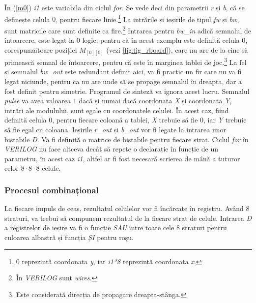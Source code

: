 \documentclass[12pt,twoside,a4paper,fleqn]{book}
\theoremstyle{definition}
\begin{document}
În (\ref{m0}) \emph{i1} este variabila din ciclul \emph{for}. Se vede deci din parametrii \emph{r} și \emph{b}, că se definește celula $0$, pentru fiecare linie.\footnote{0 reprezintă coordonata \emph{y}, iar \emph{i1*8} reprezintă coordonata \emph{x}.} La intrările și ieșirile de tipul \emph{fw} și \emph{bw}, sunt matricile care sunt definite ca fire.\footnote{În \emph{VERILOG} sunt \emph{wires}.} Intrarea pentru \emph{bw\_in} adică semnalul de întoarcere, este legat la $0$ logic, pentru că în acest exemplu este definită celula $0$, corespunzătoare poziției $M_{[0][0]}$ (vezi \ref{fig:fig_rboard}), care nu are de la cine să primească semnal de întoarcere, pentru că este în marginea tablei de joc.\footnote{Este considerată direcția de propagare dreapta-stânga.} La fel și semnalul \emph{bw\_out} este redundant definit aici, va fi practic un fir care nu va fi legat niciunde, pentru ca nu are unde să se propage semnalul în dreapta, dar a fost definit pentru simetrie. Programul de sinteză va ignora acest lucru. Semnalul \emph{pulse} va avea valoarea $1$ dacă și numai dacă coordonata \emph{X} și coordonata \emph{Y}, intrări ale modulului, sunt egale cu coordonatele celulei. În acest caz, fiind definită celula $0$, pentru fiecare coloană a tablei, \emph{X} trebuie să fie $0$, iar \emph{Y} trebuie să fie egal cu coloana. Ieșirile \emph{r\_out} și \emph{b\_out} vor fi legate la intrarea unor bistabile \emph{D}. Va fi definită o matrice de bistabile pentru fiecare strat. Ciclul \emph{for} în \emph{VERILOG} nu face altceva decât să repete o declarație în funcție de un parametru, în acest caz \emph{i1}, altfel ar fi fost necesară scrierea de mână a tuturor celor $8 \cdot 8 \cdot 8$ celule.
\subsubsection{Procesul combinațional}
La fiecare impuls de ceas, rezultatul celulelor vor fi încărcate în registru. Având $8$ straturi, va trebui să compunem rezultatul de la fiecare strat de celule. Intrarea \emph{D} a registrelor de ieșire va fi o funcție \emph{SAU} între toate cele $8$ straturi pentru culoarea albastră și funcția \emph{ȘI} pentru roșu.
\end{document}
